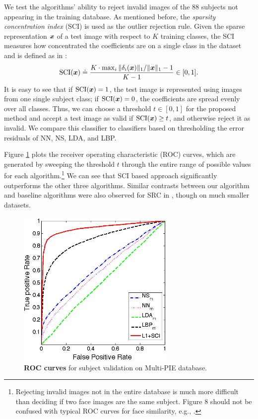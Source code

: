\documentclass[12pt,journal,draftcls,letterpaper,onecolumn]{IEEEtran}
\begin{document}
We test the algorithms' ability to reject invalid images of the
88 subjects not appearing in the training database. As
mentioned before, the \emph{sparsity concentration index} (SCI)
is used as the outlier rejection rule. Given the sparse
representation ${\boldsymbol{x}}$ of a test image with respect to $K$
training classes, the SCI measures how concentrated the
coefficients are on a single class in the dataset and is
defined as in \cite{Wright2009-PAMI}:
\begin{displaymath}
\textup{SCI}({\boldsymbol{x}}) \doteq \frac{K \cdot \max_i \|\delta_i({\boldsymbol{x}})\|_1 /
\|{\boldsymbol{x}}\|_1 - 1}{K - 1} \in [0,1] .
\end{displaymath}
It is easy to see that if $\textup{SCI}({\boldsymbol{x}}) = 1$, the test
image is represented using images from one single subject
class; if $\textup{SCI}({\boldsymbol{x}}) = 0$, the coefficients are spread
evenly over all classes. Thus, we can choose a threshold $t \in
[0,1]$ for the proposed method and accept a test image as valid
if $\textup{SCI}({\boldsymbol{x}}) \geq t$, and otherwise reject it as
invalid. We compare this classifier to classifiers based on
thresholding the error residuals of NN, NS, LDA, and LBP.

Figure \ref{fig:roc-multipie} plots the receiver operating
characteristic (ROC) curves, which are generated by sweeping
the threshold $t$ through the entire range of possible values
for each algorithm.\footnote{Rejecting invalid images not in
the entire database is much more difficult than deciding if two
face images are the same subject. Figure 8 should not be
confused with typical ROC curves for face similarity, e.g.,
\cite{PhillipsP2007}.} We can see that SCI based approach
significantly outperforms the other three algorithms. Similar
contrasts between our algorithm and baseline algorithms were
also observed for SRC in \cite{Wright2009-PAMI}, though on much
smaller datasets.

\begin{figure}
\centerline{
\includegraphics[width=3in]{figures_pami/pami_roc2.png}
}\vspace{-.2in}
\caption{{\bf ROC curves} for subject validation on Multi-PIE database.}\label{fig:roc-multipie}
\vspace{-.6in}
\end{figure}
\end{document}
